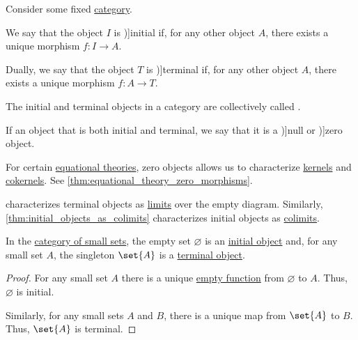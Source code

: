 \begin{definition}\label{def:universal_objects}
  Consider some fixed \hyperref[def:category]{category}.

  \begin{thmenum}
     We say that the object \( I \) is \term[ru=начальный объект (\cite[80]{ЦаленкоШульгейфер1974ОсновыТеорииКатегорий})]{initial} if, for any other object \( A \), there exists a unique morphism \( f: I \to A \).

     Dually, we say that the object \( T \) is \term[ru=конечный объект (\cite[80]{ЦаленкоШульгейфер1974ОсновыТеорииКатегорий})]{terminal} if, for any other object \( A \), there exists a unique morphism \( f: A \to T \).

     The initial and terminal objects in a category are collectively called .

     If an object that is both initial and terminal, we say that it is a \term[ru=нулевой объект (\cite[80]{ЦаленкоШульгейфер1974ОсновыТеорииКатегорий})]{null} or \term[en=zero object (\cite[def. 5.5.1]{Schubert1972Categories})]{zero object}.
  \end{thmenum}
\end{definition}
\begin{comments}
  \item For certain \hyperref[def:fol_equational_theory]{equational theories}, zero objects allows us to characterize \hyperref[def:categorical_kernels/kernel]{kernels} and \hyperref[def:categorical_kernels/cokernel]{cokernels}. See \cref{thm:equational_theory_zero_morphisms}.

  \item {} characterizes terminal objects as \hyperref[def:categorical_limit]{limits} over the empty diagram. Similarly, \cref{thm:initial_objects_as_colimits} characterizes initial objects as \hyperref[def:categorical_colimit]{colimits}.
\end{comments}

\begin{proposition}\label{thm:universal_sets}
  In the \hyperref[def:category_of_small_sets]{category of small sets}, the empty set \( \varnothing \) is an \hyperref[def:universal_objects/initial]{initial object} and, for any small set \( A \), the singleton \( \set{ A } \) is a \hyperref[def:universal_objects/terminal]{terminal object}.
\end{proposition}
\begin{proof}
  For any small set \( A \) there is a unique \hyperref[def:set_valued_function/empty]{empty function} from \( \varnothing \) to \( A \). Thus, \( \varnothing \) is initial.

  Similarly, for any small sets \( A \) and \( B \), there is a unique map from \( \set{ A } \) to \( B \). Thus, \( \set{ A } \) is terminal.
\end{proof}

